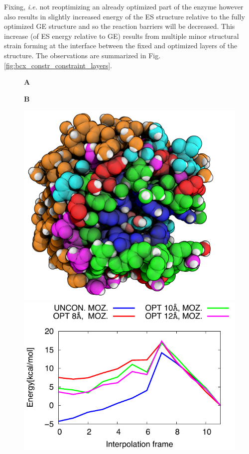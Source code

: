 Fixing, \textit{i.e.} not reoptimizing an already optimized part of the enzyme however also results in slightly increased energy of the ES structure relative to the fully optimized GE structure and so the reaction barriers will be decreased.
This increase (of ES energy relative to GE) results from multiple minor structural strain forming at the interface between the fixed and optimized layers of the structure.
The observations are summarized in Fig. \ref{fig:bcx_constr_constraint_layers}.
\begin{figure}[htbp] 
\centering
\begin{minipage}{0.42\linewidth}
\textbf{A}
\end{minipage}
\begin{minipage}{0.42\linewidth}
\textbf{B}
\end{minipage}
\begin{minipage}{0.47\linewidth}
\includegraphics[width=0.95\linewidth]{bcx-constraint-layers-ray-occlusion-2.png}
\end{minipage}
\begin{minipage}{0.51\linewidth}
\includegraphics[width=1.00\linewidth]{bcx-barriers-constraint-layers.pdf}

\end{minipage}
\end{figure}
